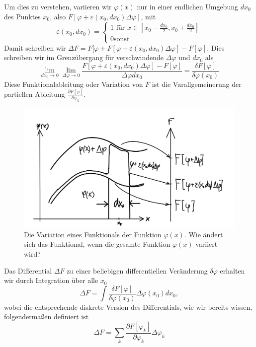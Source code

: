 Um dies zu verstehen, variieren wir $\varphi(x)$ nur in einer endlichen
Umgebung $dx_0$ des Punktes $x_0$, also
$F[\varphi+\varepsilon(x_0,dx_0)\Delta\varphi]$, mit 
  \begin{equation}\label{eq:umgebungeps}
    \varepsilon(x_0,dx_0)=\left\{\begin{matrix}1\text{ für
    }x\in[x_0-\frac{dx_0}{2},x_0+\frac{dx_0}{2}]\\ 0 \text{
    sonst}\end{matrix}\right.
  \end{equation}
Damit schreiben wir $\Delta
F=F[\varphi+F[\varphi+\varepsilon(x_0,dx_0)\Delta\varphi]-F[\varphi]$. Dies
schreiben wir im Grenzübergang für verschwindende $\Delta\varphi$ und $dx_0$
als
\begin{equation}\label{eq:Variationsableitung}
  \lim_{dx_0\rightarrow 0}\lim_{\Delta\varphi\rightarrow 0}
      \frac{F[\varphi+\varepsilon(x_0,dx_0)\Delta\varphi]-F[\varphi]}{\Delta\varphi dx_0}
    =\frac{\delta F[\varphi]}{\delta\varphi(x_0)}
\end{equation}
Diese Funktionalableitung oder Variation von $F$ ist die Varallgemeinerung der
partiellen Ableitung $\frac{\partial F[\varphi]}{\partial\varphi_k}$.
%
\begin{figure}[!h] 
 \begin{center}
  \includegraphics[height=0.4\textwidth]{fig/Variation.jpeg}
  \caption{Die Variation eines Funktionals der Funktion $\varphi(x)$. Wie ändert sich das Funktional, wenn 
  die gesamte Funktion $\varphi(x)$ variiert wird?\label{fig:variation}}
 \end{center}
\end{figure}
%
Das Differential $\Delta F$ zu einer beliebigen differentiellen Veränderung $\delta\varphi$ erhalten wir
durch Integration über alle $x_0$
\begin{equation}\label{eq:DifferentialVariation}
  \Delta F = \int\frac{\delta F[\varphi]}{\delta\varphi(x_0)}\Delta\varphi(x_0)dx_0,
\end{equation}
wobei die entsprechende diskrete Version des Differentials, wie wir bereits
wissen, folgendermaßen definiert ist
\begin{equation}\label{eq:DifferentialMultiD}
    \Delta F = \sum\limits_k \frac{\partial F[\varphi_k]}{\partial\varphi_k}\Delta\varphi_k
\end{equation}
%
